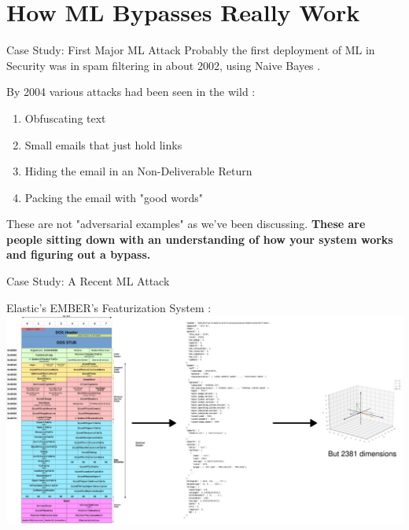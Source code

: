 \documentclass{beamer}
\begin{document}
\section{How ML Bypasses Really Work}

\begin{frame}{Case Study: First Major ML Attack}
    Probably the first deployment of ML in Security was in spam filtering in about 2002, using Naive Bayes \cite{spam_bayes}.
    \vspace{10pt} \pause

    By 2004 various attacks had been seen in the wild \cite{how_to_beat_spam}:
    \begin{enumerate}
        \item Obfuscating text 
        \item Small emails that just hold links
        \item Hiding the email in an Non-Deliverable Return
        \item Packing the email with "good words"
    \end{enumerate}
    \vspace{10pt} \pause

    These are not "adversarial examples" as we've been discussing. \textbf{These are people sitting down with an understanding of how your system works and figuring out a bypass.}
\end{frame}

\begin{frame}{Case Study: A Recent ML Attack}
    \begin{center}
        Elastic's EMBER's Featurization System \cite{anderson2018ember}:
        \includegraphics[scale=0.18]{ember_diagram.png}
    \end{center}
\end{frame}
\end{document}
